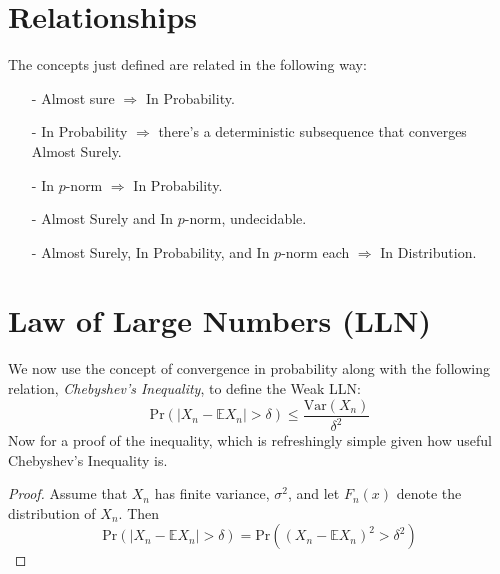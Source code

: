 \documentclass[a4paper,12pt]{scrartcl}
\begin{document}
%

\section{Relationships}

The concepts just defined are related in the following way:
\begin{itemize}
   \item[-]{Almost sure $\Rightarrow$ In Probability.}
   \item[-]{In Probability $\Rightarrow$ there's a deterministic 
      subsequence that converges Almost Surely.}
   \item[-]{In $p$-norm $\Rightarrow$ In Probability.}
   \item[-]{Almost Surely and In $p$-norm, undecidable.}
   \item[-]{Almost Surely, In Probability, and In $p$-norm each
      $\Rightarrow$ In Distribution.}
\end{itemize}

\section{Law of Large Numbers (LLN)}

We now use the concept of convergence in probability 
along with the following relation, \emph{Chebyshev's Inequality},
to define the Weak LLN:
\begin{equation}
    \label{chebyshev}
    \text{Pr}\left(\left\lvert X_n - \mathbb{E}X_n \right\rvert > 
	\delta\right) \leq \frac{\text{Var}(X_n)}{\delta^2}
\end{equation}
Now for a proof of the inequality, which is refreshingly
simple given how useful Chebyshev's Inequality is.
\begin{proof} Assume that $X_n$ has finite variance, 
    $\sigma^2$, and let $F_n(x)$ denote the distribution
    of $X_n$. Then 
    \begin{equation}
	\label{chebyproof}
	\text{Pr}\left(\left\lvert X_n - \mathbb{E}X_n 
	    \right\rvert > \delta\right)
	    = \text{Pr}\left(\left( X_n - \mathbb{E}X_n 
	    \right)^2 > \delta^2\right)
    \end{equation}
\end{proof}
\end{document}
